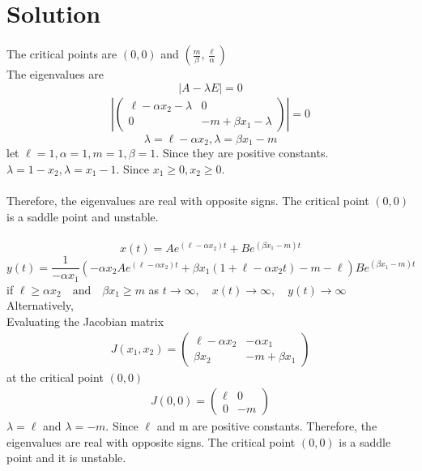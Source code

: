 \documentclass[a4paper, 12pt]{article}
\begin{document}
\section{Solution}
The critical points are $(0,0)$ and $(\frac{m}{\beta}, \frac{\ell}{\alpha})$\\
The eigenvalues are \\
$$\left| A - \lambda E \right| = 0 $$ 
\begin{align*}
\left|
\begin{pmatrix}
\ell - \alpha x_2 - \lambda & 0 \\
0 & -m+\beta x_1 - \lambda 
\end{pmatrix} \right| = 0 
\end{align*}
$$ \lambda = \ell - \alpha x_{2}, \lambda = \beta x_{1} - m $$ 
let $\ell=1, \alpha = 1, m = 1, \beta = 1 $. Since they are positive constants.
$ \lambda = 1 - x_{2}, \lambda = x_{1} - 1 $. Since $ x_{1} \ge 0 , x_{2} \ge 0 $.\\~\\
Therefore, the eigenvalues are real with opposite signs. The critical point $(0,0)$ is a saddle point and unstable.\\~\\
$$ x(t) = Ae^{(\ell - \alpha x_2)t} + Be^{(\beta x_1 - m)t} $$
$$ y(t) = \frac{1}{-\alpha x_1} \left( -\alpha x_2 Ae^{(\ell - \alpha x_2)t} + \beta x_{1}(1+\ell - \alpha x_{2}t)-m - \ell \right) Be^{(\beta x_1 - m)t}$$
if $ \ell \ge \alpha x_{2} \quad \text{and} \quad \beta x_1 \ge m $ as $t \rightarrow \infty , \quad x(t) \rightarrow \infty, \quad y(t) \rightarrow \infty $\\
Alternatively, \\
Evaluating the Jacobian matrix 
\begin{align*}
J(x_1, x_2) =
\begin{pmatrix}
\ell - \alpha x_2 & - \alpha x_{1} \\
\beta x_{2} & -m + \beta x_1
\end{pmatrix}
\end{align*}
at the critical point $(0,0)$ 
\begin{align*}
J(0,0) =
\begin{pmatrix}
\ell & 0 \\
0 & -m
\end{pmatrix}
\end{align*}
$ \lambda = \ell $ and $\lambda = -m $. Since $\ell$ and m are positive constants. Therefore, the eigenvalues are real with opposite signs. The critical point $(0,0)$ is a saddle point and it is unstable.\\~\\
\end{document}
